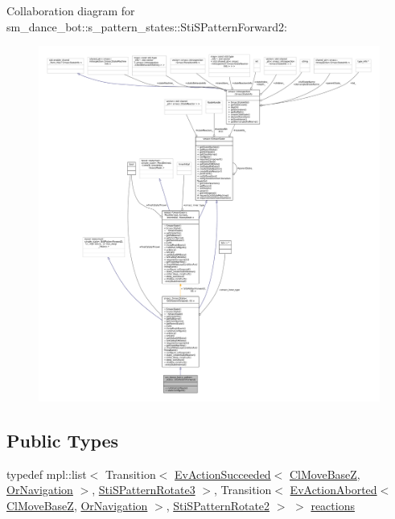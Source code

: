Collaboration diagram for sm\+\_\+dance\+\_\+bot\+:\+:s\+\_\+pattern\+\_\+states\+:\+:Sti\+S\+Pattern\+Forward2\+:
\nopagebreak
\begin{figure}[H]
\begin{center}
\leavevmode
\includegraphics[width=350pt]{structsm__dance__bot_1_1s__pattern__states_1_1StiSPatternForward2__coll__graph}
\end{center}
\end{figure}
\subsection*{Public Types}
\begin{DoxyCompactItemize}
\item 
typedef mpl\+::list$<$ Transition$<$ \hyperlink{structsmacc_1_1default__events_1_1EvActionSucceeded}{Ev\+Action\+Succeeded}$<$ \hyperlink{classcl__move__base__z_1_1ClMoveBaseZ}{Cl\+Move\+BaseZ}, \hyperlink{classsm__dance__bot_1_1OrNavigation}{Or\+Navigation} $>$, \hyperlink{structsm__dance__bot_1_1s__pattern__states_1_1StiSPatternRotate3}{Sti\+S\+Pattern\+Rotate3} $>$, Transition$<$ \hyperlink{structsmacc_1_1default__events_1_1EvActionAborted}{Ev\+Action\+Aborted}$<$ \hyperlink{classcl__move__base__z_1_1ClMoveBaseZ}{Cl\+Move\+BaseZ}, \hyperlink{classsm__dance__bot_1_1OrNavigation}{Or\+Navigation} $>$, \hyperlink{structsm__dance__bot_1_1s__pattern__states_1_1StiSPatternRotate2}{Sti\+S\+Pattern\+Rotate2} $>$ $>$ \hyperlink{structsm__dance__bot_1_1s__pattern__states_1_1StiSPatternForward2_a011ca35b5117f84d48e426d04ef9ae9f}{reactions}
\end{DoxyCompactItemize}

